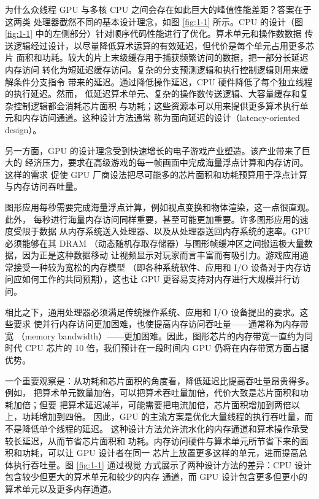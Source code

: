 为什么众线程 GPU 与多核 CPU 之间会存在如此巨大的峰值性能差距？答案在于这两类
处理器截然不同的基本设计理念，如图 \ref{fig:1-1} 所示。CPU 的设计（图
\ref{fig:1-1} 中的左侧部分）针对顺序代码性能进行了优化。算术单元和操作数数据
传送逻辑经过设计，以尽量降低算术运算的有效延迟，但代价是每个单元占用更多芯片
面积和功耗。较大的片上末级缓存用于捕获频繁访问的数据，把一部分长延迟内存访问
转化为短延迟缓存访问。复杂的分支预测逻辑和执行控制逻辑则用来缓解条件分支指令
带来的延迟。通过降低操作延迟，CPU 硬件降低了每个独立线程的执行延迟。然而，
低延迟算术单元、复杂的操作数传送逻辑、大容量缓存和复杂控制逻辑都会消耗芯片面积
与功耗；这些资源本可以用来提供更多算术执行单元和内存访问通道。这种设计方法通常
称为面向延迟的设计（latency-oriented design）。

另一方面，GPU 的设计理念受到快速增长的电子游戏产业塑造。该产业带来了巨大的
经济压力，要求在高级游戏的每一帧画面中完成海量浮点计算和内存访问。这样的需求
促使 GPU 厂商设法把尽可能多的芯片面积和功耗预算用于浮点计算与内存访问吞吐量。

图形应用每秒需要完成海量浮点计算，例如视点变换和物体渲染，这一点很直观。此外，
每秒进行海量内存访问同样重要，甚至可能更加重要。许多图形应用的速度受限于数据
从内存系统送入处理器、以及从处理器送回内存系统的速率。GPU 必须能够在其 DRAM
（动态随机存取存储器）与图形帧缓冲区之间搬运极大量数据，因为正是这种数据移动
让视频显示对玩家而言丰富而有吸引力。游戏应用通常接受一种较为宽松的内存模型
（即各种系统软件、应用和 I/O 设备对于内存访问应如何工作的共同预期），这也让 GPU
更容易支持对内存进行大规模并行访问。

相比之下，通用处理器必须满足传统操作系统、应用和 I/O 设备提出的要求。这些要求
使并行内存访问更加困难，也使提高内存访问吞吐量——通常称为内存带宽
（memory bandwidth）——更加困难。因此，图形芯片的内存带宽一直约为同时代 CPU
芯片的 10 倍，我们预计在一段时间内 GPU 仍将在内存带宽方面占据优势。

一个重要观察是：从功耗和芯片面积的角度看，降低延迟比提高吞吐量昂贵得多。例如，
把算术单元数量加倍，可以把算术吞吐量加倍，代价大致是芯片面积和功耗加倍；但要
把算术延迟减半，可能需要把电流加倍，芯片面积增加到两倍以上，功耗增加到四倍。
因此，GPU 的主流方案是优化大量线程的执行吞吐量，而不是降低单个线程的延迟。
这种设计方法允许流水化的内存通道和算术操作承受较长延迟，从而节省芯片面积和
功耗。内存访问硬件与算术单元所节省下来的面积和功耗，可以让 GPU 设计者在同一
芯片上放置更多这样的单元，进而提高总体执行吞吐量。图 \ref{fig:1-1} 通过视觉
方式展示了两种设计方法的差异：CPU 设计包含较少但更大的算术单元和较少的内存
通道，而 GPU 设计包含更多但更小的算术单元以及更多内存通道。

